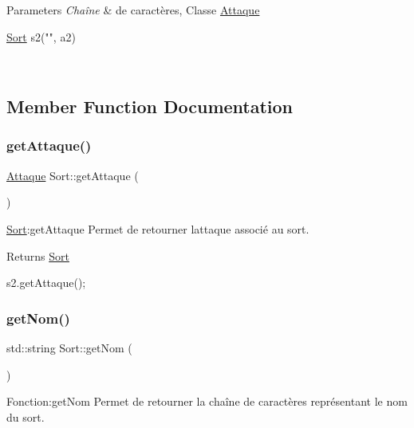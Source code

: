 \begin{DoxyParams}{Parameters}
{\em Chaîne} & de caractères, Classe \hyperlink{classAttaque}{Attaque} 
\begin{DoxyCode}
\hyperlink{classSort}{Sort} s2(\textcolor{stringliteral}{""}, a2)
\end{DoxyCode}
 \\
\hline
\end{DoxyParams}


\subsection{Member Function Documentation}
\mbox{\label{classSort_ac24b0d4c2caf033df5ddcc3f281bc634}} 
\subsubsection{\texorpdfstring{get\+Attaque()}{getAttaque()}}
{\footnotesize\ttfamily \hyperlink{classAttaque}{Attaque} Sort\+::get\+Attaque (\begin{DoxyParamCaption}{ }\end{DoxyParamCaption})}



\hyperlink{classSort}{Sort}\+:get\+Attaque Permet de retourner l\textquotesingle{}attaque associé au sort. 

\begin{DoxyReturn}{Returns}
\hyperlink{classSort}{Sort} 
\begin{DoxyCode}
s2.getAttaque();
\end{DoxyCode}
 
\end{DoxyReturn}
\mbox{\label{classSort_a249f3b41badad1b1fa14b3bf6d3736f3}} 
\subsubsection{\texorpdfstring{get\+Nom()}{getNom()}}
{\footnotesize\ttfamily std\+::string Sort\+::get\+Nom (\begin{DoxyParamCaption}{ }\end{DoxyParamCaption})}



Fonction\+:get\+Nom Permet de retourner la chaîne de caractères représentant le nom du sort. 


